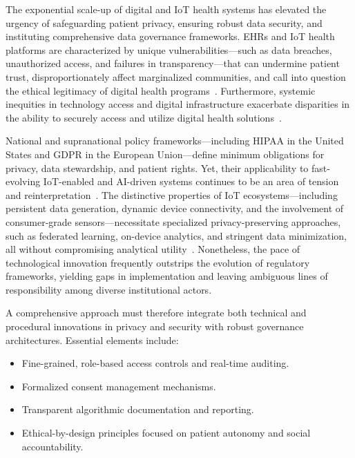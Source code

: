 \documentclass[11pt]{article}
\begin{document}
The exponential scale-up of digital and IoT health systems has elevated the urgency of safeguarding patient privacy, ensuring robust data security, and instituting comprehensive data governance frameworks. EHRs and IoT health platforms are characterized by unique vulnerabilities—such as data breaches, unauthorized access, and failures in transparency—that can undermine patient trust, disproportionately affect marginalized communities, and call into question the ethical legitimacy of digital health programs~\cite{ref2, ref6, ref7, ref8, ref9, ref10, ref24, ref25, ref28, ref30, ref46, ref50, ref51, ref61, ref63, ref64, ref70, ref82, ref83, ref84, ref106}. Furthermore, systemic inequities in technology access and digital infrastructure exacerbate disparities in the ability to securely access and utilize digital health solutions~\cite{ref84, ref106}.

National and supranational policy frameworks—including HIPAA in the United States and GDPR in the European Union—define minimum obligations for privacy, data stewardship, and patient rights. Yet, their applicability to fast-evolving IoT-enabled and AI-driven systems continues to be an area of tension and reinterpretation~\cite{ref2, ref4, ref5, ref6, ref7, ref8, ref9, ref10, ref24, ref25, ref28, ref30, ref31, ref33, ref34, ref35, ref36, ref41, ref43, ref46, ref50, ref54, ref51, ref61, ref62, ref63, ref64, ref65, ref70, ref71, ref72, ref75, ref76, ref77, ref78, ref79, ref82, ref83, ref84, ref90}. The distinctive properties of IoT ecosystems—including persistent data generation, dynamic device connectivity, and the involvement of consumer-grade sensors—necessitate specialized privacy-preserving approaches, such as federated learning, on-device analytics, and stringent data minimization, all without compromising analytical utility~\cite{ref83, ref84, ref90}. Nonetheless, the pace of technological innovation frequently outstrips the evolution of regulatory frameworks, yielding gaps in implementation and leaving ambiguous lines of responsibility among diverse institutional actors.

A comprehensive approach must therefore integrate both technical and procedural innovations in privacy and security with robust governance architectures. Essential elements include:

\begin{itemize}
    \item Fine-grained, role-based access controls and real-time auditing.
    \item Formalized consent management mechanisms.
    \item Transparent algorithmic documentation and reporting.
    \item Ethical-by-design principles focused on patient autonomy and social accountability.
\end{itemize}
\end{document}
